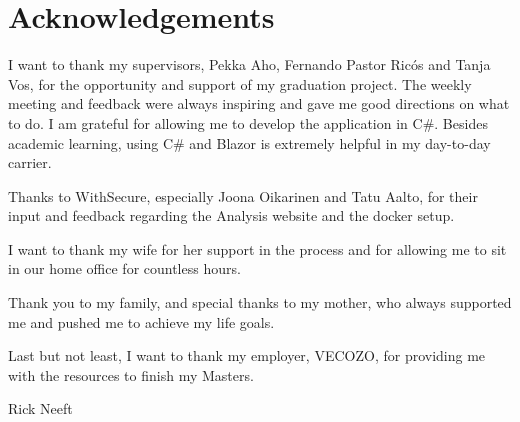 \chapter*{Acknowledgements}

I want to thank my supervisors, Pekka Aho, Fernando Pastor Ricós and Tanja Vos, for the opportunity and support of my graduation project. The weekly meeting and feedback were always inspiring and gave me good directions on what to do. I am grateful for allowing me to develop the application in C\#. Besides academic learning, using C\# and Blazor is extremely helpful in my day-to-day carrier.

Thanks to WithSecure, especially Joona Oikarinen and Tatu Aalto, for their input and feedback regarding the Analysis website and the docker setup.

I want to thank my wife for her support in the process and for allowing me to sit in our home office for countless hours. 

Thank you to my family, and special thanks to my mother, who always supported me and pushed me to achieve my life goals. 

Last but not least, I want to thank my employer, VECOZO, for providing me with the resources to finish my Masters. 

Rick Neeft\\
\myPresentationDate